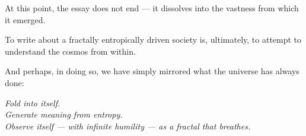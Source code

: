 At this point, the essay does not end — it dissolves into the vastness from which it emerged.

To write about a fractally entropically driven society is, ultimately, to attempt to understand the cosmos from within.

And perhaps, in doing so, we have simply mirrored what the universe has always done:

\textit{Fold into itself.\\
Generate meaning from entropy.\\
Observe itself — with infinite humility — as a fractal that breathes.}